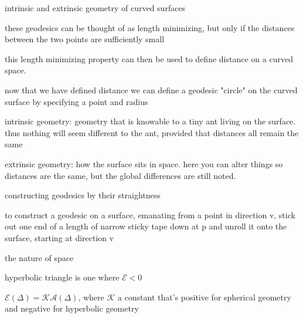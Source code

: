 \documentclass{article}
\newenvironment{andrew_section}[1]
    {
    \section{#1}
    \begin{itemize}
    }
    {
    \end{itemize}
    }
\begin{document}
\begin{andrew_section}{intrinsic and extrinsic geometry of curved surfaces}
    \item 
        these geodesics can be thought of as length minimizing,
        but only if the distances between the two points are sufficiently
        small
    \item 
        this length minimizing property can then be used to define
        distance on a curved space.
    \item 
        now that we have defined distance we can define a geodesic
        "circle" on the curved surface by specifying a point and radius
    \item 
        intrinsic geometry: geometry that is knowable to a tiny ant
        living on the surface.  thus nothing will seem different to the
        ant, provided that distances all remain the same
    \item 
        extrinsic geometry: how the surface sits in space.  here you can
        alter things so distances are the same, but the global differences
        are still noted.
\end{andrew_section}

\begin{andrew_section}{constructing geodesics by their straightness}
    \item 
        to construct a geodesic on a surface, emanating from a
        point in direction v, stick out one end of a length of 
        narrow sticky tape down at p and unroll it onto the surface, 
        starting at direction v
    
\end{andrew_section}

\begin{andrew_section}{the nature of space}
    \item hyperbolic triangle is one where $\mathcal{E} < 0$
    \item 
        $\mathcal{E}(\Delta) = \mathcal{K}\mathcal{A} (\Delta)$,
        where $\mathcal{K}$ a constant that's positive for spherical
        geometry and negative for hyperbolic geometry
\end{andrew_section}
\end{document}
